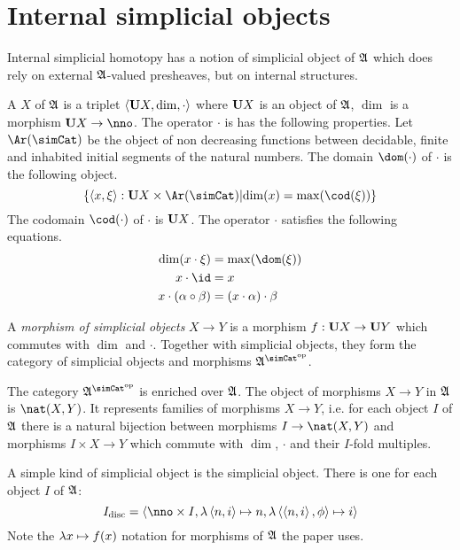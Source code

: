 \documentclass[csh.tex]{subfiles}
\begin{document}
\section{Internal simplicial objects}
Internal simplicial homotopy has a notion of simplicial object of $\mathfrak A$ which does rely on external $\mathfrak A$-valued presheaves, but on internal structures.

\begin{definition} A  $X$ of $\mathfrak A$ is a triplet $\left\langle \mathbf{U} X, \dim, \cdot \right\rangle$ where $\mathbf{U} X$ is an object of $\mathfrak A$, $\dim$ is a morphism $\base X\to \nno$. The operator $\cdot$ is has the following properties. Let $\Ar(\simCat)$ be the object of non decreasing functions between decidable, finite and inhabited initial segments of the natural numbers. The domain $\dom(\cdot)$ of $\cdot$ is the following object. 
\[ \set{\tuplet{x,\xi}\of \base X\times \Ar(\simCat)\middle| \dim(x) = \max(\cod(\xi))}\]
The codomain $\cod(\cdot)$ of $\cdot$ is $\mathbf{U} X$. The operator $\cdot$ satisfies the following equations.
\begin{align*}
\dim(x\cdot\xi) &= \max(\dom(\xi))\\
x\cdot \id &= x \\
x\cdot(\alpha\circ\beta)&=(x\cdot\alpha)\cdot\beta 
\end{align*}

A \emph{morphism of simplicial objects} $X\to Y$ is a morphism $f:\mathbf{U} X\to\mathbf{U} Y$ which commutes with $\dim$ and $\cdot$. Together with simplicial objects, they form the category of simplicial objects and morphisms $\ambient\s$.

The category $\ambient\s$ is enriched over $\mathfrak A$. The object of morphisms $X\to Y$ in $\mathfrak A$ is $\nat(X,Y)$. It represents families of morphisms $X\to Y$, i.e. for each object $I$ of $\mathfrak A$ there is a natural bijection between morphisms $I\to \nat(X,Y)$ and morphisms $I\times X\to Y$ which commute with $\dim$, $\cdot$ and their $I$-fold multiples.
\end{definition}

\begin{example} A simple kind of simplicial object is the  simplicial object. There is one for each object $I$ of $\mathfrak A$: 
\[ I\disc = \tuplet{\nno\times I,\function{\tuplet{n,i}}n,\function{\tuplet{\tuplet{n,i},\phi}}i} \]
Note the $\lambda x \mapsto f(x)$ notation for morphisms of $\mathfrak A$ the paper uses.
\end{example}
\end{document}
